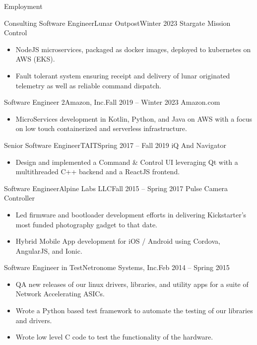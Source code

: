 \documentclass[]{mussocv}
\begin{document}
	\makeheader
	
	\begin{cvsection}{Employment}
		\begin{cvsubsection}{Consulting Software Engineer}{Lunar Outpost}{Winter 2023}
			Stargate Mission Control			
			\begin{itemize}
				\item NodeJS microservices, packaged as docker images, deployed to kubernetes on AWS (EKS). 
				\item Fault tolerant system ensuring receipt and delivery of lunar originated telemetry as well as reliable command dispatch. 
			\end{itemize}
		\end{cvsubsection}
		
		\begin{cvsubsection}{Software Engineer 2}{Amazon, Inc.}{Fall 2019 -- Winter 2023}
			Amazon.com
			\begin{itemize}
				\item MicroServices development in Kotlin, Python, and Java on AWS with a focus on low touch containerized and serverless infrastructure.
			\end{itemize}
		\end{cvsubsection}
		
		\begin{cvsubsection}{Senior Software Engineer}{TAIT}{Spring 2017 -- Fall 2019}
			iQ And Navigator 
			\begin{itemize}
				\item Design and implemented a Command \& Control UI leveraging Qt with a multithreaded C++ backend and a ReactJS frontend.
			\end{itemize}
		\end{cvsubsection}
		
		\begin{cvsubsection}{Software Engineer}{Alpine Labs LLC}{Fall 2015 -- Spring 2017}
			Pulse Camera Controller	
			\begin{itemize}
				\item Led firmware and bootloader development efforts in delivering Kickstarter's most funded photography gadget to that date.
				\item Hybrid Mobile App development for iOS / Android using Cordova, AngularJS, and Ionic.
			\end{itemize}
		\end{cvsubsection}

		\begin{cvsubsection}{Software Engineer in Test}{Netronome Systems, Inc.}{Feb 2014 -- Spring 2015}
			\begin{itemize}
				\item QA new releases of our linux drivers, libraries, and utility apps for a suite of Network Accelerating ASICs.
				\item Wrote a Python based test framework to automate the testing of our libraries and drivers.
				\item Wrote low level C code to test the functionality of the hardware.
			\end{itemize}
		\end{cvsubsection}


\end{cvsection}
\end{document}
